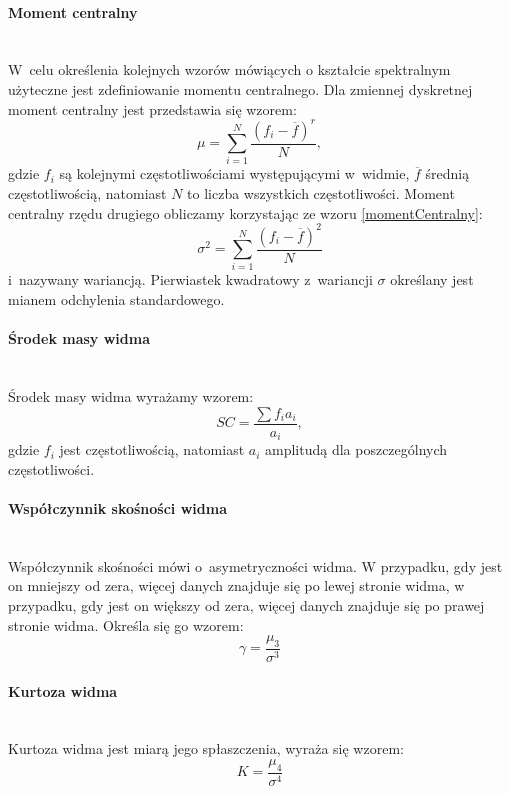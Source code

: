 \paragraph{Moment centralny}\mbox{}\\
W~celu określenia kolejnych wzorów mówiących o kształcie spektralnym użyteczne jest zdefiniowanie momentu centralnego. Dla zmiennej dyskretnej moment centralny jest przedstawia się wzorem:
\begin{equation}\label{momentCentralny}
\mu = \sum^{N}_{i=1} \frac{(f_i - \overline{f})^r}{N},
\end{equation}
gdzie $f_i$ są kolejnymi częstotliwościami występującymi w~widmie, $\overline{f}$ średnią częstotliwością, natomiast $N$ to liczba wszystkich częstotliwości. Moment centralny rzędu drugiego obliczamy korzystając ze wzoru \ref{momentCentralny}:
\begin{equation}
\sigma ^ 2 = \sum^{N}_{i=1} \frac{(f_i - \overline{f})^2}{N}
\end{equation}
i~nazywany wariancją. Pierwiastek kwadratowy z~wariancji $\sigma$ określany jest mianem odchylenia standardowego.

\paragraph{Środek masy widma}\mbox{}\\
Środek masy widma wyrażamy wzorem:
\begin{equation}
SC = \frac{\sum f_i a_i}{a_i},
\end{equation}
gdzie $f_i$ jest częstotliwością, natomiast $a_i$ amplitudą dla poszczególnych częstotliwości\cite{phdWork}.

\paragraph{Współczynnik skośności widma}\mbox{}\\
Współczynnik skośności mówi o~asymetryczności widma. W przypadku, gdy jest on mniejszy od zera, więcej danych znajduje się po lewej stronie widma, w przypadku, gdy jest on większy od zera, więcej danych znajduje się po prawej stronie widma. Określa się go wzorem:
\begin{equation}
\gamma = \frac{\mu _3 }{\sigma ^3}
\end{equation}

\paragraph{Kurtoza widma}\mbox{}\\
Kurtoza widma jest miarą jego spłaszczenia, wyraża się wzorem:
\begin{equation}
K = \frac{\mu _4 }{\sigma ^4}
\end{equation}

